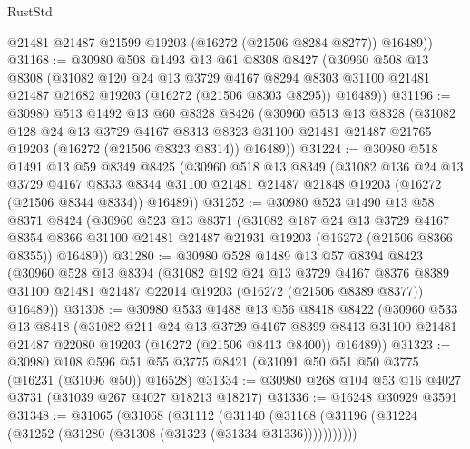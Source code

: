 \begin{lexlean}{RustStd}
\begin{coremodule}
        @21481
        @21487
        @21599
        @19203
        (@16272 (@21506 @8284 @8277))
        @16489))
@31168 := @30980
    @508
    @1493
    @13
    @61
    @8308
    @8427
    (@30960
      @508
      @13
      @8308
      (@31082
        @120
        @24
        @13
        @3729
        @4167
        @8294
        @8303
        @31100
        @21481
        @21487
        @21682
        @19203
        (@16272 (@21506 @8303 @8295))
        @16489))
@31196 := @30980
    @513
    @1492
    @13
    @60
    @8328
    @8426
    (@30960
      @513
      @13
      @8328
      (@31082
        @128
        @24
        @13
        @3729
        @4167
        @8313
        @8323
        @31100
        @21481
        @21487
        @21765
        @19203
        (@16272 (@21506 @8323 @8314))
        @16489))
@31224 := @30980
    @518
    @1491
    @13
    @59
    @8349
    @8425
    (@30960
      @518
      @13
      @8349
      (@31082
        @136
        @24
        @13
        @3729
        @4167
        @8333
        @8344
        @31100
        @21481
        @21487
        @21848
        @19203
        (@16272 (@21506 @8344 @8334))
        @16489))
@31252 := @30980
    @523
    @1490
    @13
    @58
    @8371
    @8424
    (@30960
      @523
      @13
      @8371
      (@31082
        @187
        @24
        @13
        @3729
        @4167
        @8354
        @8366
        @31100
        @21481
        @21487
        @21931
        @19203
        (@16272 (@21506 @8366 @8355))
        @16489))
@31280 := @30980
    @528
    @1489
    @13
    @57
    @8394
    @8423
    (@30960
      @528
      @13
      @8394
      (@31082
        @192
        @24
        @13
        @3729
        @4167
        @8376
        @8389
        @31100
        @21481
        @21487
        @22014
        @19203
        (@16272 (@21506 @8389 @8377))
        @16489))
@31308 := @30980
    @533
    @1488
    @13
    @56
    @8418
    @8422
    (@30960
      @533
      @13
      @8418
      (@31082
        @211
        @24
        @13
        @3729
        @4167
        @8399
        @8413
        @31100
        @21481
        @21487
        @22080
        @19203
        (@16272 (@21506 @8413 @8400))
        @16489))
@31323 := @30980
    @108
    @596
    @51
    @55
    @3775
    @8421
    (@31091 @50 @51 @50 @3775 (@16231 (@31096 @50)) @16528)
@31334 := @30980 @268 @104 @53 @16 @4027 @3731 (@31039 @267 @4027 @18213 @18217)
@31336 := @16248 @30929 @3591
@31348 := @31065
    (@31068
      (@31112
        (@31140 (@31168 (@31196 (@31224 (@31252 (@31280 (@31308 (@31323 (@31334 @31336)))))))))))

\end{coremodule}
\end{lexlean}

